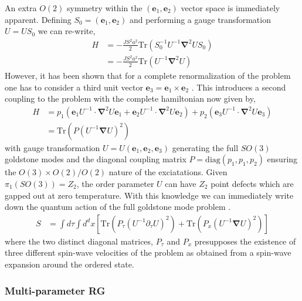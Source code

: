 \documentclass[notitlepage,onecolumn,showpacs,11pt]{revtex4-1}
\newcommand{\mbf}[1]{\mathbf{#1}}
\newcommand{\grad}{\boldsymbol{\nabla}}
\newcommand{\Tr}{\text{Tr}}
\begin{document}
An extra $O(2)$ symmetry within the $(\mbf{e}_1,\mbf{e}_2)$ vector space is immediately apparent.
Defining $S_0=(\mbf{e}_1,\mbf{e}_2)$ and performing a gauge transformation $U = US_0$ we can re-write,
\begin{equation}
    \begin{aligned}
        H &= -\frac{JS^2a^2}{2} \Tr\left(S_0^{-1} U^{-1}\grad^2U S_0\right)\\
        &= -\frac{JS^2a^2}{2} \Tr\left(U^{-1}\grad^2U\right)
    \end{aligned}
\end{equation}
However, it has been shown that for a complete renormalization of the problem one has to consider a
third unit vector $\mbf{e}_3=\mbf{e}_1\times\mbf{e}_{2}$ \cite{azaria-93}. This introduces a second
coupling to the problem with the complete hamiltonian now given by,
\begin{equation}
    \begin{aligned}
        H &= p_1\left(\mbf{e}_1 U^{-1}\cdot\grad^2U\mbf{e}_1
        +\mbf{e}_2 U^{-1}\cdot\grad^2U\mbf{e}_2
        \right)
        +p_2\left(\mbf{e}_3 U^{-1}\cdot\grad^2U\mbf{e}_3\right)\\
        &=\Tr\left(P(U^{-1}\grad U)^2\right)
    \end{aligned}
\end{equation}
with gauge transformation $U = U (\mbf{e}_1,\mbf{e}_2,\mbf{e}_3)$ generating the full $SO(3)$
goldstone modes and the diagonal coupling matrix $P=\text{diag}(p_1,p_1,p_2)$ ensuring the 
$O(3)\times O(2)/O(2)$ nature of the exciatations. Given $\pi_1(SO(3))=Z_2$, the order parameter 
$U$ can have $Z_2$ point defects which are gapped out at zero temperature. With this knowledge we 
can immediately write down the quantum action of the full goldstone mode problem 
\cite{dombre-88,azaria-92}.
\begin{equation}
    \begin{aligned}
        S &=\int d\tau\int d^dx 
        \left[
        \Tr\left(P_\tau(U^{-1}\partial_\tau U)^2\right)
        +
        \Tr\left(P_x(U^{-1}\grad U)^2\right)
        \right]
    \end{aligned}
\end{equation}
where the two distinct diagonal matrices, $P_\tau$ and $P_x$ presupposes the existence of
three different spin-wave velocities of the problem as obtained from a spin-wave expansion
around the ordered state.



\subsubsection{Multi-parameter RG}
\end{document}
